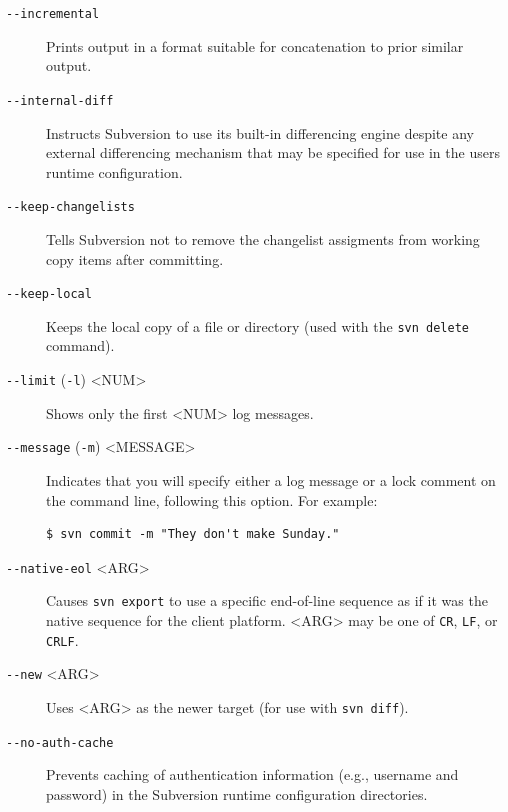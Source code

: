 \begin{description}
\item[\protect{}\label{svn.ref.svn.sw.incremental}{}\texttt{-\/-incremental}]
Prints output in a format suitable for concatenation to prior similar
output.
\item[\protect{}\label{svn.ref.svn.sw.internal_diff}{}\texttt{-\/-internal-diff}]
Instructs Subversion to use its built-in differencing engine despite any
external differencing mechanism that may be specified for use in the
user\textquotesingle s runtime configuration.
\item[\protect{}\label{svn.ref.svn.sw.keep_changelists}{}\texttt{-\/-keep-changelists}]
Tells Subversion not to remove the changelist assigments from working
copy items after committing.
\item[\protect{}\label{svn.ref.svn.sw.keep_local}{}\texttt{-\/-keep-local}]
Keeps the local copy of a file or directory (used with the
\texttt{svn\ delete} command).
\item[\protect{}\label{svn.ref.svn.sw.limit}{}\texttt{-\/-limit}
(\texttt{-l}) \textless NUM\textgreater{}]
Shows only the first \textless NUM\textgreater{} log messages.
\item[\protect{}\label{svn.ref.svn.sw.message}{}\texttt{-\/-message}
(\texttt{-m}) \textless MESSAGE\textgreater{}]
Indicates that you will specify either a log message or a lock comment
on the command line, following this option. For example:

\begin{verbatim}
$ svn commit -m "They don't make Sunday."
\end{verbatim}
\item[\protect{}\label{svn.ref.svn.sw.native_eol}{}\texttt{-\/-native-eol}
\textless ARG\textgreater{}]
Causes \texttt{svn\ export} to use a specific end-of-line sequence as if
it was the native sequence for the client platform.
\textless ARG\textgreater{} may be one of \texttt{CR}, \texttt{LF}, or
\texttt{CRLF}.
\item[\protect{}\label{svn.ref.svn.sw.new}{}\texttt{-\/-new}
\textless ARG\textgreater{}]
Uses \textless ARG\textgreater{} as the newer target (for use with
\texttt{svn\ diff}).
\item[\protect{}\label{svn.ref.svn.sw.no_auth_cache}{}\texttt{-\/-no-auth-cache}]
Prevents caching of authentication information (e.g., username and
password) in the Subversion runtime configuration directories.


\end{description}
